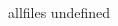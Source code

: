 \documentclass{article}
\begin{document}
\begin{CJK}{UTF8}{gbsn}     %

\else
	

\fi

\ifx allfiles undefined
\end{CJK}
\end{document}
